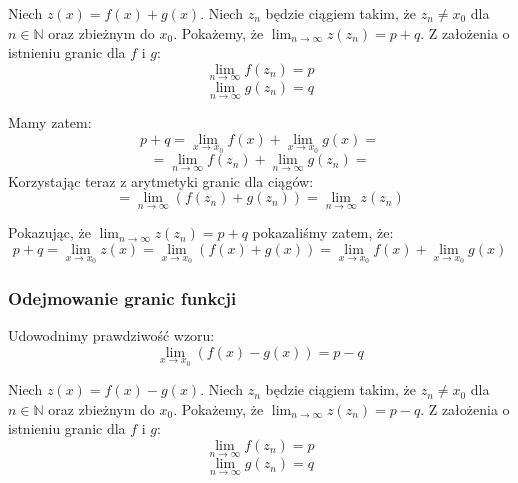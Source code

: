 \documentclass{article}
\begin{document}
Niech \(z(x) = f(x) + g(x)\). Niech \(z_n\) będzie ciągiem takim, że \(z_n \neq x_0\) dla \(n \in \mathbb{N}\) oraz zbieżnym do \(x_0\).
Pokażemy, że \(\lim_{n \to \infty} z(z_n) = p + q\). Z założenia o istnieniu granic dla \(f\) i \(g\):
\begin{equation*}
    \lim_{n \to \infty} f(z_n) = p
\end{equation*}
\begin{equation*}
    \lim_{n \to \infty} g(z_n) = q
\end{equation*}

Mamy zatem:
\begin{equation*}
    p + q = \lim_{x \to x_0} f(x) + \lim_{x \to x_0} g(x) = 
\end{equation*}
\begin{equation*}
    = \lim_{n \to \infty} f(z_n) + \lim_{n \to \infty} g(z_n) =
\end{equation*}
Korzystając teraz z arytmetyki granic dla ciągów:
\begin{equation*}
    = \lim_{n \to \infty} (f(z_n) + g(z_n)) = \lim_{n \to \infty} z(z_n)
\end{equation*}

Pokazując, że \(\lim_{n \to \infty} z(z_n) = p + q\) pokazaliśmy zatem, że:
\begin{equation*}
    p + q = \lim_{x \to x_0} z(x) = \lim_{x \to x_0} (f(x) + g(x)) = \lim_{x \to x_0} f(x) + \lim_{x \to x_0} g(x)
\end{equation*}

\subsubsection{Odejmowanie granic funkcji}

Udowodnimy prawdziwość wzoru:
\begin{equation*}
    \lim_{x \to x_0}(f(x) - g(x)) = p - q
\end{equation*}

Niech \(z(x) = f(x) - g(x)\). Niech \(z_n\) będzie ciągiem takim, że \(z_n \neq x_0\) dla \(n \in \mathbb{N}\) oraz zbieżnym do \(x_0\).
Pokażemy, że \(\lim_{n \to \infty} z(z_n) = p - q\). Z założenia o istnieniu granic dla \(f\) i \(g\):
\begin{equation*}
    \lim_{n \to \infty} f(z_n) = p
\end{equation*}
\begin{equation*}
    \lim_{n \to \infty} g(z_n) = q
\end{equation*}
\end{document}

